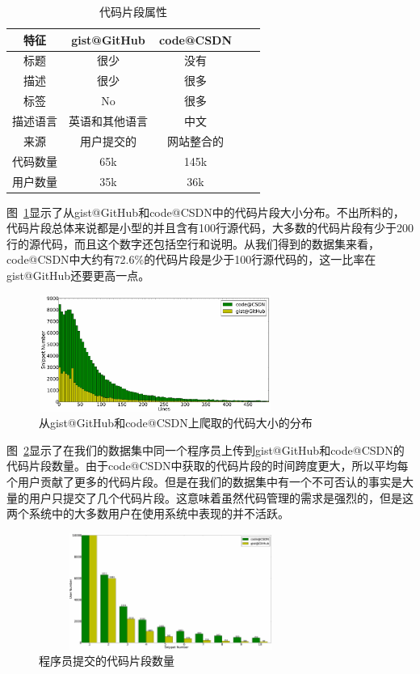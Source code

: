 \documentclass[10pt,journal,draftcls,onecolumn]{IEEEtran}
\begin{document}
\begin{CJK*}{UTF8}{gbsn}
\begin{table}
  \centering
  \caption{代码片段属性}
  \begin{tabular}{ccccc}
    \hline
    特征                & gist@GitHub       & code@CSDN  &  & \\
    \hline
    标题                   & 很少               & 没有        &  &  \\
    描述             & 很少               & 很多      &  &  \\
    标签                     & No                & 很多      &  &  \\
    描述语言       & 英语和其他语言  & 中文   &  &  \\
    来源                 & 用户提交的            & 网站整合的 &  &  \\
    代码数量            & 65k              & 145k       &  &  \\
    用户数量               & 35k              & 36k        &  &  \\
    \hline
  \end{tabular}
  \label{table_snippets}
\end{table}
图~\ref{gist_size}显示了从gist@GitHub和code@CSDN中的代码片段大小分布。不出所料的，代码片段总体来说都是小型的并且含有100行源代码，大多数的代码片段有少于200行的源代码，而且这个数字还包括空行和说明。从我们得到的数据集来看，code@CSDN中大约有72.6$\%$的代码片段是少于100行源代码的，这一比率在gist@GitHub还要更高一点。
\begin{figure}
\centering
  \includegraphics[height=1.5in, width=3in]{lines.eps}
  \caption{从gist@GitHub和code@CSDN上爬取的代码大小的分布}\label{gist_size}
\end{figure}

图~\ref{gist_programmer}显示了在我们的数据集中同一个程序员上传到gist@GitHub和code@CSDN的代码片段数量。由于code@CSDN中获取的代码片段的时间跨度更大，所以平均每个用户贡献了更多的代码片段。但是在我们的数据集中有一个不可否认的事实是大量的用户只提交了几个代码片段。这意味着虽然代码管理的需求是强烈的，但是这两个系统中的大多数用户在使用系统中表现的并不活跃。
\begin{figure}
\centering
  \includegraphics[height=1.5in,width=3.4in]{user.eps}
  \caption{程序员提交的代码片段数量}\label{gist_programmer}
\end{figure}


\end{CJK*}
\end{document}
